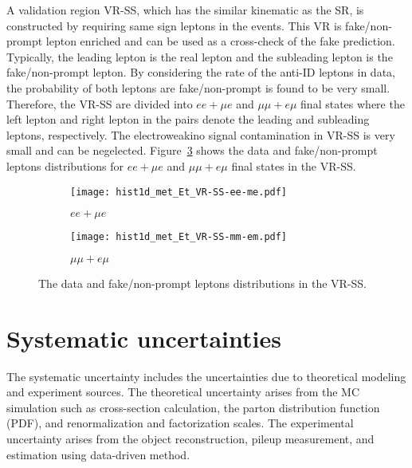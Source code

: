 A validation region VR-SS, which has the similar kinematic as the SR, is constructed by requiring same sign leptons in the events.
This VR is fake/non-prompt lepton enriched and can be used as a cross-check of the fake prediction. 
Typically, the leading lepton is the real lepton and the subleading lepton is the fake/non-prompt lepton.
By considering the rate of the anti-ID leptons in data, the probability of both leptons are fake/non-prompt is found to be very small.
Therefore, the VR-SS are divided into $ee+\mu e$ and $\mu \mu + e\mu$ final states where the left lepton and right lepton in the pairs denote the leading and subleading leptons, respectively.
The electroweakino signal contamination in VR-SS is very small and can be negelected.
Figure~\ref{fig:bkg_fake_distributions} shows the data and fake/non-prompt leptons \met distributions for $ee+\mu e$ and $\mu \mu + e\mu$ final states in the VR-SS.

\begin{figure}[htbp]
    \begin{center}
        \begin{subfigure}[b]{0.48\textwidth}
            \texttt{[image: hist1d\_met\_Et\_VR-SS-ee-me.pdf]}
            \caption{$ee+\mu e$}
            \label{fig:bkg_ee_mue_fake_distribution}
        \end{subfigure}
        \begin{subfigure}[b]{0.48\textwidth}
            \texttt{[image: hist1d\_met\_Et\_VR-SS-mm-em.pdf]}
            \caption{$\mu \mu + e\mu$}
            \label{fig:bkg_mumu_emu_fake_distribution}
        \end{subfigure}
        \caption{The data and fake/non-prompt leptons \met distributions in the VR-SS.}
        \label{fig:bkg_fake_distributions}
    \end{center}
\end{figure}


\section{Systematic uncertainties}
\label{sec:bkg_systematic_uncertainties}
The systematic uncertainty includes the uncertainties due to theoretical modeling and experiment sources.
The theoretical uncertainty arises from the MC simulation such as cross-section calculation, the parton distribution function (PDF), and renormalization and factorization scales.
The experimental uncertainty arises from the object reconstruction, pileup measurement, and estimation using data-driven method.


